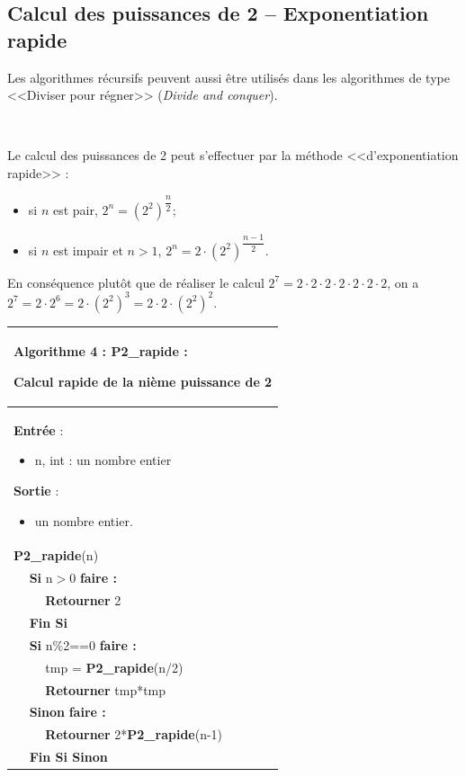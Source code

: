 \documentclass[10pt,fleqn]{article} %
\newcommand{\bfsf}[1]{\small\textbf{\textsf{#1}}}%
\newcommand{\tsf}[1]{\small{\textsf{#1}}}
\begin{document}
\subsection{Calcul des puissances de 2 -- Exponentiation rapide}

Les algorithmes récursifs peuvent aussi être utilisés dans les algorithmes de type <<Diviser pour régner>> (\textit{Divide and conquer}).

\begin{exemple}
$\;$ \\

\begin{minipage}[c]{.45\linewidth}
Le calcul des puissances de 2 peut s'effectuer par la méthode <<d'exponentiation rapide>> :
\begin{itemize}
\item si $n$ est pair, $2^n = \left(2^2\right)^{\dfrac{n}{2}}$;
\item si $n$ est impair et $n>1$, $2^n =2\cdot  \left(2^2\right)^{\dfrac{n-1}{2}}$.
\end{itemize}

En conséquence plutôt que de réaliser le calcul $ 2^7 = 2\cdot 2\cdot 2\cdot 2\cdot 2\cdot 2\cdot 2$, on a $ 2^7 = 2\cdot 2^6 =  2\cdot \left(2^2\right)^3=  2\cdot 2 \cdot \left(2^2\right)^2$. 
\end{minipage}\hfill
\begin{minipage}[c]{.45\linewidth}
\begin{tabular}{p{.5cm}p{.5cm}p{5cm}}
\hline
\multicolumn{3}{p{6cm}}{ \textbf{Algorithme 4 : P2\_rapide} : 

Calcul rapide de la nième puissance de 2} \\
\hline
\multicolumn{3}{p{6cm}}{
\textbf{Entrée} : 
\begin{itemize}
\item n, int  : un nombre entier
\end{itemize}
\textbf{Sortie} : 
\begin{itemize}
\item un nombre entier.
\end{itemize}}\\
\multicolumn{3}{p{6cm}}{\bfsf{P2\_rapide}\tsf{(n)}} \\
& \multicolumn{2}{l}{\bfsf{Si} \tsf{n$>$0} \bfsf{faire :}}\\
& & \bfsf{Retourner} 2\\
& \multicolumn{2}{l}{\bfsf{Fin Si}}\\
& \multicolumn{2}{l}{\bfsf{Si} \tsf{n\%2==0} \bfsf{faire :}}\\
&& \tsf{tmp} = \bfsf{P2\_rapide}\tsf{(n/2)}\\
&& \bfsf{Retourner} tmp*tmp\\
& \multicolumn{2}{l}{\bfsf{Sinon} \bfsf{faire :}}\\
&& \bfsf{Retourner} \tsf{2*}\bfsf{P2\_rapide}\tsf{(n-1)}\\
& \multicolumn{2}{l}{\bfsf{Fin Si Sinon}}\\
\hline
\end{tabular}
\end{minipage}
\end{exemple}
\end{document}
